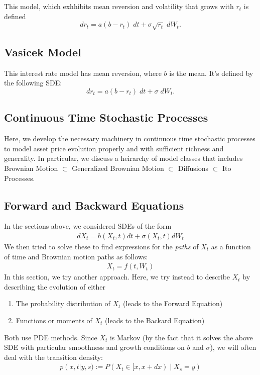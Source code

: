 \documentclass[12pt]{article}
\theoremstyle{plain}
\theoremstyle{definition}
\theoremstyle{remark}
\begin{document}
This model, which exhhibits mean reversion and volatility that grows
with $r_t$ is defined
   \[ dr_t = a(b-r_t) \; dt + \sigma \sqrt{r_t} \; dW_t.\]

\subsection{Vasicek Model}

This interest rate model has mean reversion, where $b$ is the mean. It's
defined by the following SDE:
   \[ dr_t = a(b-r_t) \; dt + \sigma \; dW_t.\]

\subsection{Continuous Time Stochastic Processes}

Here, we develop the necessary machinery in continuous time stochastic
processes to model asset price evolution properly and with sufficient
richness and generality. In particular, we discuss a heirarchy of model
classes that includes Brownian Motion $\subset$ Generalized Brownian
Motion $\subset$ Diffusions $\subset$ Ito Processes.


\subsection{Forward and Backward Equations}

In the sections above, we considered SDEs of the form
\begin{align*}
  dX_t = b(X_t,t) dt + \sigma(X_t,t) dW_t
\end{align*}
We then tried to solve these to find expressions for the \emph{paths} of $X_t$ as a function of time and Brownian motion paths as follows:
\begin{align*}
  X_t = f(t,W_t)
\end{align*}
In this section, we try another approach. Here, we try instead to
describe $X_t$ by describing the evolution of either
\begin{enumerate}
  \item The probability distribution of $X_t$ (leads to the Forward
    Equation)
  \item Functions or moments of $X_t$ (leads to the Backard Equation)
\end{enumerate}
Both use PDE methods. Since $X_t$ is Markov (by the fact that it solves
the above SDE with particular smoothness and growth conditions on $b$
and $\sigma$), we will often deal with the transition density:
\begin{align*}
  p(x,t|y,s) := P(X_t\in [x,x+dx) \; | \; X_s=y)
\end{align*}
\end{document}
